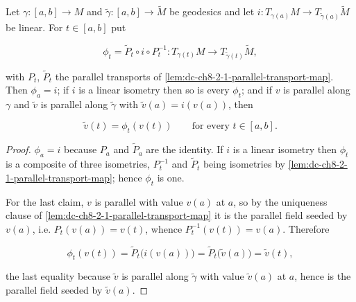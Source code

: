 \begin{lemma}
  \label{lem:dc-ch8-2-1-phi}


  Let $\gamma:[a,b]\to M$ and $\tilde\gamma:[a,b]\to\tilde M$ be geodesics and let
  $i:T_{\gamma(a)}M\to T_{\tilde\gamma(a)}\tilde M$ be linear. For $t\in[a,b]$ put

  $$
  \phi_t=\tilde P_t\circ i\circ P_t^{-1}:
  T_{\gamma(t)}M\longrightarrow T_{\tilde\gamma(t)}\tilde M,
  $$

  with $P_t$, $\tilde P_t$ the parallel transports of
  \cref{lem:dc-ch8-2-1-parallel-transport-map}. Then $\phi_a=i$; if $i$ is a linear isometry
  then so is every $\phi_t$; and if $v$ is parallel along $\gamma$ and $\tilde v$ is parallel
  along $\tilde\gamma$ with $\tilde v(a)=i(v(a))$, then

  $$
  \tilde v(t)=\phi_t(v(t))\qquad\text{for every }t\in[a,b].
  $$

\end{lemma}
\begin{proof}

\sketch
  $\phi_a=i$ because $P_a$ and $\tilde P_a$ are the identity. If $i$ is a linear isometry then
  $\phi_t$ is a composite of three isometries, $P_t^{-1}$ and $\tilde P_t$ being isometries by
  \cref{lem:dc-ch8-2-1-parallel-transport-map}; hence $\phi_t$ is one.

  For the last claim, $v$ is parallel with value $v(a)$ at $a$, so by the uniqueness clause of
  \cref{lem:dc-ch8-2-1-parallel-transport-map} it is the parallel field seeded by $v(a)$, i.e.
  $P_t(v(a))=v(t)$, whence $P_t^{-1}(v(t))=v(a)$. Therefore

  $$
  \phi_t(v(t))=\tilde P_t\big(i(v(a))\big)=\tilde P_t\big(\tilde v(a)\big)=\tilde v(t),
  $$

  the last equality because $\tilde v$ is parallel along $\tilde\gamma$ with value $\tilde v(a)$
  at $a$, hence is the parallel field seeded by $\tilde v(a)$.
\end{proof}

